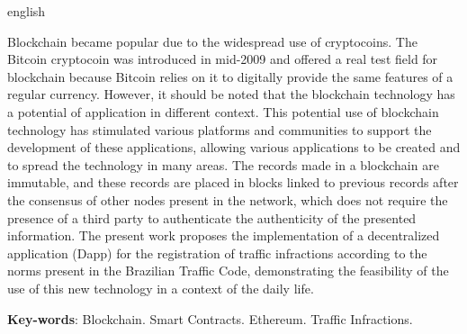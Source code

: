 \begin{resumo}[Abstract]
 \begin{otherlanguage*}{english}
  
Blockchain became popular due to the widespread use of cryptocoins. The Bitcoin cryptocoin was introduced in mid-2009 and offered a real test field for blockchain because Bitcoin relies on it to digitally provide the same features of a regular currency. However, it should be noted that the blockchain technology has a potential of application in different context. This potential use of blockchain technology has stimulated various platforms and communities to support the development of these applications, allowing various applications to be created and to spread the technology in many areas. The records made in a blockchain are immutable, and these records are placed in blocks linked to previous records after the consensus of other nodes present in the network, which does not require the presence of a third party to authenticate the authenticity of the presented information. The present work proposes the implementation of a decentralized application (Dapp) for the registration of traffic infractions according to the norms present in the Brazilian Traffic Code, demonstrating the feasibility of the use of this new technology in a context of the daily life.
  

   \vspace{\onelineskip}
 
   \noindent 
   \textbf{Key-words}: Blockchain. Smart Contracts. Ethereum. Traffic Infractions.
 \end{otherlanguage*}
\end{resumo}
